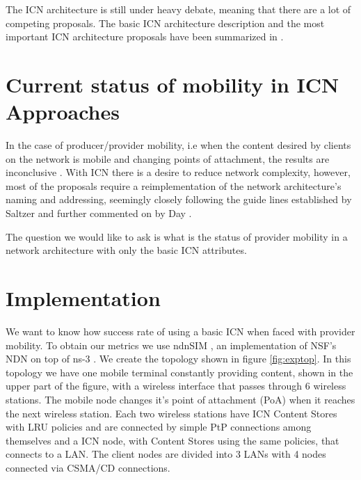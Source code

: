 \documentclass[twocolumn, a4paper]{ieicejsp}
\begin{document}
The ICN architecture is still under heavy debate, meaning that there are a lot
of competing proposals. 
The basic ICN architecture description and the most important ICN architecture
proposals have been summarized in \cite{6563278}. 

\section{Current status of mobility in ICN Approaches}


In the case of producer/provider mobility, i.e when the content desired by
clients on the network is mobile and changing points of attachment, the results
are inconclusive \cite{Tyson:2012:SMI:2248361.2248363}. With ICN there is a 
desire to reduce network complexity, however, most of the proposals require a
reimplementation of the network architecture's naming and addressing, seemingly
closely following the guide lines established by Saltzer 
\cite{saltzer:namingandbindingnetworks} and further commented on by Day
\cite{Day:2008:PNA:1349793}. 


The question we would like to ask is what is
the status of provider mobility in a network architecture with only the basic
ICN attributes.

\section{Implementation}
We want to know how success rate of using a basic ICN when faced with provider
mobility. To obtain our metrics we use ndnSIM \cite{ndn367}, an implementation
of NSF's NDN \cite{nsfndn:2014:Online} on top of ns-3 \cite{ns3:2014:Online}.
We create the topology shown in figure \ref{fig:exptop}.  In this topology we
have one mobile terminal constantly providing content, shown in the upper part
of the figure, with a wireless interface that passes through 6 wireless stations.
The mobile node changes it's point of attachment (PoA) when it reaches the next
wireless station. Each two wireless stations have ICN Content Stores with LRU
policies and are connected by simple PtP connections among themselves and a ICN
node, with Content Stores using the same policies, that connects to a LAN. The
client nodes are divided into 3 LANs with 4 nodes connected via CSMA/CD connections. 
\end{document}
